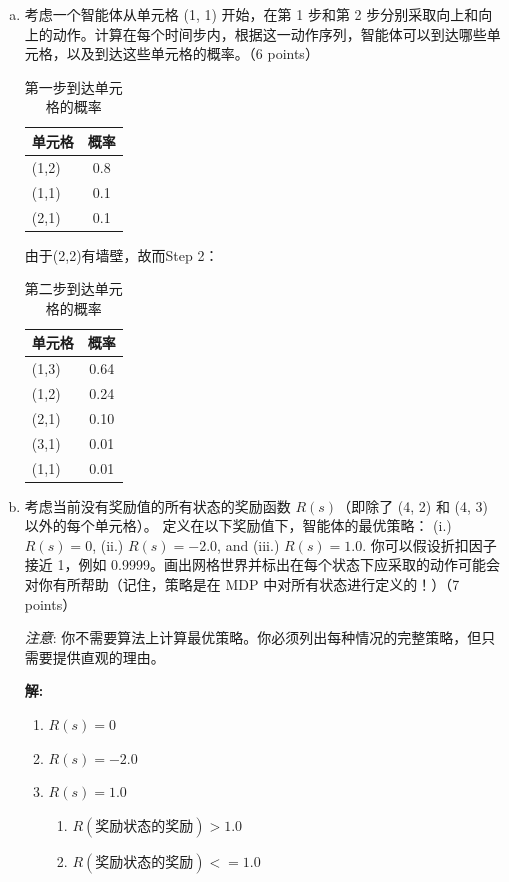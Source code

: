 \documentclass[8pt]{article}
\begin{document}
\begin{enumerate}[(a)]
\item 
考虑一个智能体从单元格 (1, 1) 开始，在第 1 步和第 2 步分别采取向上和向上的动作。计算在每个时间步内，根据这一动作序列，智能体可以到达哪些单元格，以及到达这些单元格的概率。（6 points）

\begin{table}[H]
    \centering
    \begin{tabular}{|l|c|}
    \hline
       单元格 &  概率\\
    \hline
       (1,2) & 0.8 \\
    \hline
        (1,1) & 0.1 \\
    \hline
        (2,1) & 0.1 \\
    \hline
    \end{tabular}
    \caption{第一步到达单元格的概率}
    \label{tab:first step Prob}
\end{table}

由于(2,2)有墙壁，故而Step 2：
\begin{table}[H]
    \centering
    \begin{tabular}{|l|c|}
    \hline
       单元格 &  概率\\
    \hline
       (1,3) & 0.64 \\
    \hline
        (1,2) & 0.24 \\
    \hline
        (2,1) & 0.10 \\
    \hline
        (3,1) & 0.01 \\
    \hline
        (1,1) & 0.01 \\
    \hline
    \end{tabular}
    \caption{第二步到达单元格的概率}
    \label{tab:second step Prob}
\end{table}

\vspace{1em}

\item
考虑当前没有奖励值的所有状态的奖励函数 $R(s)$（即除了 (4, 2) 和 (4, 3) 以外的每个单元格）。 定义在以下奖励值下，智能体的最优策略： (i.) $R(s) = 0$, (ii.) $R(s) = -2.0$, and (iii.) $R(s) = 1.0$. 你可以假设折扣因子接近 1，例如 0.9999。画出网格世界并标出在每个状态下应采取的动作可能会对你有所帮助（记住，策略是在 MDP 中对所有状态进行定义的！）（7 points）

\emph{注意}: 你不需要算法上计算最优策略。你必须列出每种情况的完整策略，但只需要提供直观的理由。
        
\textbf{\large 解:}

\begin{enumerate}[label=(\roman*)]
    \item $R(s) = 0$
    \item $R(s) = -2.0$
    \item $R(s) = 1.0$
    \begin{enumerate}
        \item $R(奖励状态的奖励) > 1.0$
        \item $R(奖励状态的奖励) <= 1.0$
    \end{enumerate}
\end{enumerate}


\end{enumerate}
\end{document}
